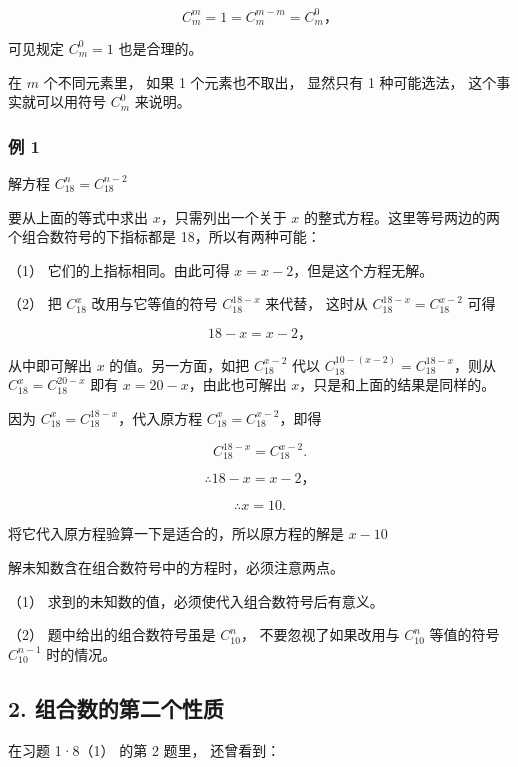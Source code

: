 \[
C _ {m} ^ {m} = 1 = C _ {m} ^ {m - m} = C _ {m} ^ {0}\text{，}
\]

可见规定 \(C_{m}^{0} = 1\) 也是合理的。

 在 \(m\) 个不同元素里， 如果 1 个元素也不取出，
显然只有 1 种可能选法， 这个事实就可以用符号 \(C_{m}^{0}\) 来说明。

\subsubsection{例 1}

解方程 \(C_{18}^{n}=C_{18}^{n-2}\)

 要从上面的等式中求出 \(x\)，只需列出一个关于 \(x\)
的整式方程。这里等号两边的两个组合数符号的下指标都是
18，所以有两种可能：

（1） 它们的上指标相同。由此可得 \(x = x - 2\)，但是这个方程无解。

（2） 把 \(C_{18}^{x}\) 改用与它等值的符号 \(C_{18}^{18-x}\) 来代替，
这时从 \(C_{18}^{18-x} = C_{18}^{x - 2}\) 可得

\[
18 - x = x - 2\text{，}
\]

从中即可解出 \(x\) 的值。另一方面，如把 \(C_{18}^{x - 2}\) 代以
\(C_{18}^{10 - (x - 2)} = C_{18}^{18-x}\)，则从
\(C_{18}^{x} = C_{18}^{20 - x}\) 即有 \(x = 20 - x\)，由此也可解出
\(x\)，只是和上面的结果是同样的。

 因为 \(C_{18}^{x} = C_{18}^{18-x}\)，代入原方程
\(C_{18}^{x} = C_{18}^{x - 2}\)，即得

\[
C _ {18} ^ {18 - x} = C _ {18} ^ {x - 2}.
\]

\[
\therefore 18 - x = x - 2\text{，}
\]

\[
\therefore x = 10.
\]

将它代入原方程验算一下是适合的，所以原方程的解是 \(x - 10\)

 解未知数含在组合数符号中的方程时，必须注意两点。

（1） 求到的未知数的值，必须使代入组合数符号后有意义。

（2） 题中给出的组合数符号虽是 \(C_{10}^{n}\)， 不要忽视了如果改用与
\(C_{10}^{n}\) 等值的符号 \(C_{10}^{n-1}\) 时的情况。

\subsection{2. 组合数的第二个性质}

在习题 1·8（1） 的第 2 题里， 还曾看到：

